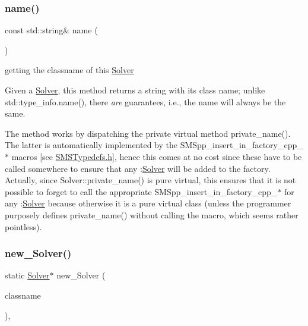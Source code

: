 \subsubsection{\texorpdfstring{name()}{name()}}
{\footnotesize\ttfamily const std\+::string\& name (\begin{DoxyParamCaption}\item[{void}]{ }\end{DoxyParamCaption})\hspace{0.3cm}{\ttfamily [inline]}}



getting the classname of this \mbox{\hyperlink{class_s_m_spp__di__unipi__it_1_1_solver}{Solver}} 

Given a \mbox{\hyperlink{class_s_m_spp__di__unipi__it_1_1_solver}{Solver}}, this method returns a string with its class name; unlike std\+::type\+\_\+info.\+name(), there {\itshape are} guarantees, i.\+e., the name will always be the same.

The method works by dispatching the private virtual method private\+\_\+name(). The latter is automatically implemented by the S\+M\+Spp\+\_\+insert\+\_\+in\+\_\+factory\+\_\+cpp\+\_\+$\ast$ macros \mbox{[}see \mbox{\hyperlink{_s_m_s_typedefs_8h}{S\+M\+S\+Typedefs.\+h}}\mbox{]}, hence this comes at no cost since these have to be called somewhere to ensure that any \+:\mbox{\hyperlink{class_s_m_spp__di__unipi__it_1_1_solver}{Solver}} will be added to the factory. Actually, since Solver\+::private\+\_\+name() is pure virtual, this ensures that it is not possible to forget to call the appropriate S\+M\+Spp\+\_\+insert\+\_\+in\+\_\+factory\+\_\+cpp\+\_\+$\ast$ for any \+:\mbox{\hyperlink{class_s_m_spp__di__unipi__it_1_1_solver}{Solver}} because otherwise it is a pure virtual class (unless the programmer purposely defines private\+\_\+name() without calling the macro, which seems rather pointless). \mbox{\label{class_s_m_spp__di__unipi__it_1_1_solver_a0e815f782f461461f585c5635d9fea6b}} 
\subsubsection{\texorpdfstring{new\+\_\+\+Solver()}{new\_Solver()}}
{\footnotesize\ttfamily static \mbox{\hyperlink{class_s_m_spp__di__unipi__it_1_1_solver}{Solver}}$\ast$ new\+\_\+\+Solver (\begin{DoxyParamCaption}\item[{const std\+::string \&}]{classname }\end{DoxyParamCaption})\hspace{0.3cm}{\ttfamily [inline]}, {\ttfamily [static]}}



